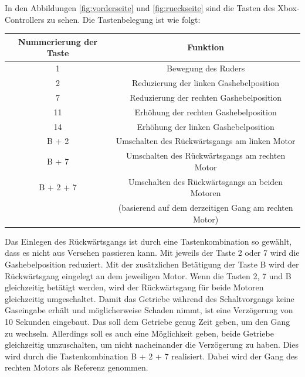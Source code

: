 In den Abbildungen \ref{fig:vorderseite} und \ref{fig:rueckseite} sind die Tasten des Xbox-Controllers zu sehen.
Die Tastenbelegung ist wie folgt:

\begin{table}[H]
    \begin{tabular}{|c|c|}
    \hline
    \rowcolor[gray]{0.8}
     Nummerierung der Taste & Funktion \\ \hline 
     1 & Bewegung des Ruders \\ \hline 
     2 & Reduzierung der linken Gashebelposition \\ \hline 
     7 & Reduzierung der rechten Gashebelposition \\ \hline
     11 & Erhöhung der rechten Gashebelposition \\ \hline
     14 & Erhöhung der linken Gashebelposition \\ \hline
     B + 2 & Umschalten des Rückwärtsgangs am linken Motor \\ \hline
     B + 7 & Umschalten des Rückwärtsgangs am rechten Motor \\ \hline
     B + 2 + 7 & Umschalten des Rückwärtsgangs an beiden Motoren \\
      & (basierend auf dem derzeitigen Gang am rechten Motor) \\ \hline
    \end{tabular}
\end{table}
Das Einlegen des Rückwärtsgangs ist durch eine Tastenkombination so gewählt, dass es nicht aus Versehen passieren kann.
Mit jeweils der Taste 2 oder 7 wird die Gashebelposition reduziert. Mit der zusätzlichen Betätigung der Taste B wird der 
Rückwärtsgang eingelegt an dem jeweiligen Motor. Wenn die Tasten 2, 7 und B gleichzeitig betätigt werden, 
wird der Rückwärtsgang für beide Motoren gleichzeitig umgeschaltet.
Damit das Getriebe während des Schaltvorgangs keine Gaseingabe erhält und möglicherweise Schaden nimmt, 
ist eine Verzögerung von 10 Sekunden eingebaut. 
Das soll dem Getriebe genug Zeit geben, um den Gang zu wechseln.
Allerdings soll es auch eine Möglichkeit geben, beide Getriebe gleichzeitig umzuschalten, um nicht 
nacheinander die Verzögerung zu haben. Dies wird durch die Tastenkombination B + 2 + 7 realisiert.
Dabei wird der Gang des rechten Motors als Referenz genommen. \\

